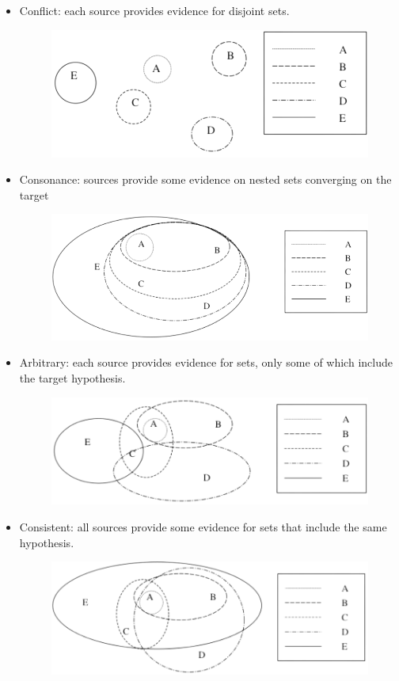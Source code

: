 \documentclass[12pt, a4paper]{report}
\newtheorem[style=M,bodystyle=\normalfont]{theorem}{Theorem}
\newtheorem[style=M,bodystyle=\normalfont]{corollary}{Corollary}
\newtheorem[style=M,bodystyle=\normalfont]{lemma}{Lemma}
\newtheorem[style=M,bodystyle=\normalfont]{definition}{Definition}
\begin{document}
    \begin{itemize}
        \item Conflict: each source provides evidence for disjoint sets. 
            \begin{figure}[H]
                \centering
                \includegraphics[width=0.5\linewidth]{images/conflict.png}
            \end{figure}
        \item Consonance: sources provide some evidence on nested sets converging on the target
            \begin{figure}[H]
                \centering
                \includegraphics[width=0.5\linewidth]{images/consonance.png}
            \end{figure}
        \item Arbitrary: each source provides evidence for sets, only some of which include the target hypothesis. 
            \begin{figure}[H]
                \centering
                \includegraphics[width=0.5\linewidth]{images/arbitrary.png}
            \end{figure}
        \item Consistent: all sources provide some evidence for sets that include the same hypothesis. 
            \begin{figure}[H]
                \centering
                \includegraphics[width=0.5\linewidth]{images/consistent.png}
            \end{figure}
    \end{itemize}
\end{document}
